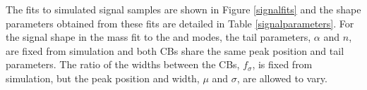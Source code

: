 %

The fits to simulated signal samples are shown in Figure \ref{signalfits} and the shape parameters obtained from these fits are detailed in Table \ref{signalparameters}. For the signal shape in the mass fit to the \kpi and \kpipipi modes, the tail parameters, $\alpha$ and $n$, are fixed from simulation and both CBs share the same peak position and tail parameters. The ratio of the widths between the CBs, $f_{\sigma}$, is fixed from simulation, but the peak position and width, $\mu$ and $\sigma$, are allowed to vary.

